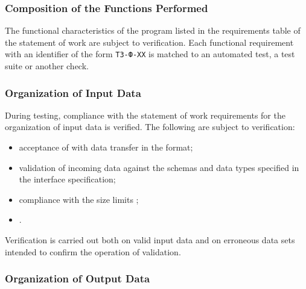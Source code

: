 \documentclass[12pt,a4paper]{extarticle}
\begin{document}
\subsubsection{Composition of the Functions Performed}


The functional characteristics of the program listed in the requirements table of the statement of work are subject to verification. Each functional requirement with an identifier of the form \texttt{ТЗ-Ф-XX} is matched to an automated test, a test suite or another check.



\clearpage

\subsubsection{Organization of Input Data}

\begin{hseExample}
During testing, compliance with the statement of work requirements for the organization of input data is verified. The following are subject to verification:

\begin{itemize}[leftmargin=1.25cm]
    \item acceptance of  with data transfer in the  format;
    \item validation of incoming data against the schemas and data types specified in the interface specification;
    \item compliance with the size limits ;
    \item {}.
\end{itemize}

Verification is carried out both on valid input data and on erroneous data sets intended to confirm the operation of validation.
\end{hseExample}

\subsubsection{Organization of Output Data}
\end{document}
